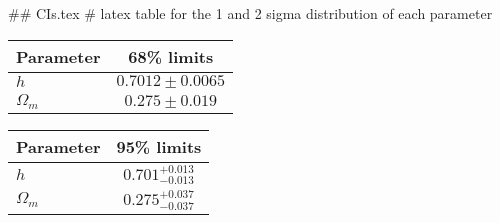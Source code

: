## CIs.tex
# latex table for the 1 and 2 sigma distribution of each parameter

\begin{tabular} { l  c}
 Parameter &  68\% limits\\
\hline
{\boldmath$h              $} & $0.7012\pm 0.0065          $\\
{\boldmath$\Omega_m       $} & $0.275\pm 0.019            $\\
\hline
\end{tabular}

\begin{tabular} { l  c}
 Parameter &  95\% limits\\
\hline
{\boldmath$h              $} & $0.701^{+0.013}_{-0.013}   $\\
{\boldmath$\Omega_m       $} & $0.275^{+0.037}_{-0.037}   $\\
\hline
\end{tabular}
